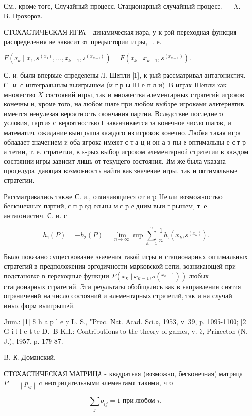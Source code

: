 \documentclass[10pt]{article}
\begin{document}
См., кроме того, Случайный процесс, Стационарный случайный процесс. $\quad$ A. В. Прохоров.



СТОХАСТИЧЕСКАЯ ИГРА - динамическая иәра, у к-рой переходная функция распределения не зависит от предыстории игры, т. е.



$F\left(x_{k} \mid x_{1}, s^{\left(x_{1}\right)}, \ldots, x_{k-1}, s^{\left(x_{k-1}\right)}\right)=F\left(x_{k} \mid x_{k-1}, s^{\left(x_{k-1}\right)}\right)$.



С. и. были впервые определены Л. Шепли [1], к-рый рассматривал антагонистич. С. и. с интегральным выигрышем (и г р ы Ш е п л и). В играх Шепли как множество $X$ состояний игры, так и множества әлементарных стратегий игроков конечны и, кроме того, на любом шаге при любом выборе игроками альтернатив имеется ненулевая вероятность окончания партии. Вследствие последнего условия, партия с вероятностью 1 заканчивается за конечное число шагов, и математич. ожидание выигрыша каждого из игроков конечно. Любая такая игра обладает значением и оба игрока имеют с т а ц и он а р пы е оптимальны е с т р а тетии, т. е. стратегии, в к-рых выбор игроком әлементарной стратегии в каждом состоянии игры зависит лишь от текущего состояния. Им же была указана процедура, дающая возможность найти как значение игры, так и оптимальные стратегии.



Рассматривались также С. и., отличающиеся от игр IIепли возможностью бесконечных партий, с п р ед ельны м с р е дним выи г рышем, т. е. антагонистич. С. и. с



\[

h_{1}(P)=-h_{2}(P)=\lim _{n \rightarrow \infty} \sup \sum_{k=1}^{n} \frac{1}{n} h_{i}\left(x_{k}, s^{\left(x_{k}\right)}\right) .

\]



Было показано существование значения такой игры и стационарных оптимальных стратегий в предположении эргодичности марковской цепи, возникающей при подстановке в переходные функции $F\left(x_{k} \mid x_{k-1}, s\left({ }^{x_{k}-1}\right)\right)$ любых стационарных стратегий. Эти результаты обобщались как в направлении снятия ограничений на число состояний и әлементарных стратегий, так и на случай иных форм выигрышей.



Jum.: [1] S $\mathrm{h}$ a p l e y L. S., "Proc. Nat. Acad. Sci.», 1953, v. 39, p. 1095-1100; [2] G i l l e t te D., B KH.: Contributions to the theory of games, v. 3, Princeton (N. J.), 1957, p. 179-87.

B. К. Доманский.



СТОХАСТИЧЕСКАЯ МАТРИЦА - квадратная (возможно, бесконечная) матрица $P=\left\|p_{i j}\right\| \mathrm{c}$ неотрицательными элементами такими, что



\[

\sum_{j} p_{i j}=1 \text { при любом } i \text {. }

\]
\end{document}
